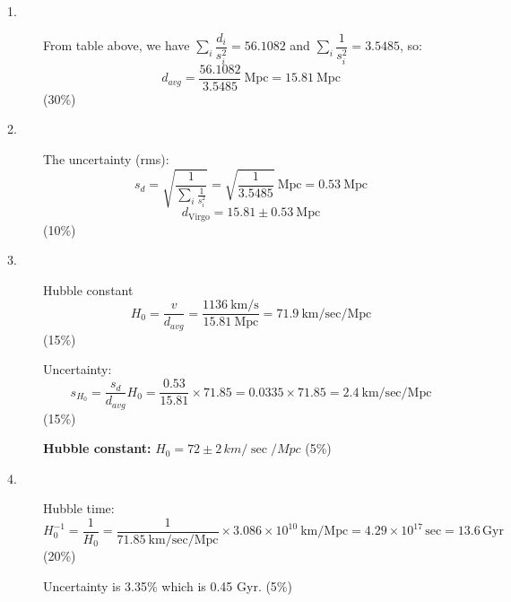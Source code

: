 \begin{description}
\item[1.] From table above, we have
  $\sum_i \dfrac{d_i}{s_i^2} = 56.1082$ and
  $\sum_i \dfrac{1}{s_i^2} = 3.5485$, so:
  \[ d_{avg} = \frac{56.1082}{3.5485}\ \mathrm{Mpc} = 15.81\ \mathrm{Mpc} \]
  \hfill(30\%)

\item[2.] The uncertainty (rms):
  \[ s_d = \sqrt{\frac{1}{\sum_i \frac{1}{s_i^2}}}
     = \sqrt{\frac{1}{3.5485}}\ \mathrm{Mpc} = 0.53\ \mathrm{Mpc} \]
  \[ d_{\mathrm{Virgo}} = 15.81 \pm 0.53\ \mathrm{Mpc} \]
  \hfill(10\%)

\item[3.] Hubble constant
  \[ H_0 = \frac{v}{d_{avg}} = \frac{1136\ \mathrm{km/s}}{15.81\ \mathrm{Mpc}}
     = 71.9\ \mathrm{km/sec/Mpc} \]
  \hfill(15\%)

  Uncertainty:
  \[ s_{H_0} = \frac{s_d}{d_{avg}}H_0 = \frac{0.53}{15.81}\times 71.85
     = 0.0335\times 71.85 = 2.4\ \mathrm{km/sec/Mpc} \]
  \hfill(15\%)

  \textbf{Hubble constant:} $H_0 = 72 \pm 2\,km/\sec/Mpc$
  \hfill(5\%)

\item[4.] Hubble time:
  \[ H_0^{-1} = \frac{1}{H_0} = \frac{1}{71.85\ \mathrm{km/sec/Mpc}}
     \times 3.086\times 10^{10}\ \mathrm{km/Mpc}
     = 4.29\times 10^{17}\,\mathrm{sec} = 13.6\,\mathrm{Gyr} \]
  \hfill(20\%)

  Uncertainty is 3.35\% which is 0.45 Gyr.
  \hfill(5\%)
\end{description}

